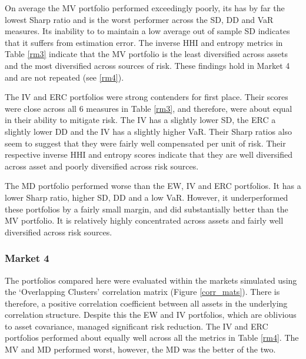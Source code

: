 \documentclass[11pt,preprint, authoryear]{elsarticle}
\numberwithin{equation}{section}
\numberwithin{figure}{section}
\numberwithin{table}{section}
\begin{document}
On average the MV portfolio performed exceedingly poorly, its has by far
the lowest Sharp ratio and is the worst performer across the SD, DD and
VaR measures. Its inability to to maintain a low average out of sample
SD indicates that it suffers from estimation error. The inverse HHI and
entropy metrics in Table \ref{rm3} indicate that the MV portfolio is the
least diversified across assets and the most diversified across sources
of risk. These findings hold in Market 4 and are not repeated (see
\ref{rm4}).

The IV and ERC portfolios were strong contenders for first place. Their
scores were close across all 6 measures in Table \ref{rm3}, and
therefore, were about equal in their ability to mitigate risk. The IV
has a slightly lower SD, the ERC a slightly lower DD and the IV has a
slightly higher VaR. Their Sharp ratios also seem to suggest that they
were fairly well compensated per unit of risk. Their respective inverse
HHI and entropy scores indicate that they are well diversified across
asset and poorly diversified across risk sources.

The MD portfolio performed worse than the EW, IV and ERC portfolios. It
has a lower Sharp ratio, higher SD, DD and a low VaR. However, it
underperformed these portfolios by a fairly small margin, and did
substantially better than the MV portfolio. It is relatively highly
concentrated across assets and fairly well diversified across risk
sources.

\hypertarget{market-4}{%
\subsubsection{Market 4}\label{market-4}}

The portfolios compared here were evaluated within the markets simulated
using the `Overlapping Clusters' correlation matrix (Figure
\ref{corr_mats}). There is therefore, a positive correlation coefficient
between all assets in the underlying correlation structure. Despite this
the EW and IV portfolios, which are oblivious to asset covariance,
managed significant risk reduction. The IV and ERC portfolios performed
about equally well across all the metrics in Table \ref{rm4}. The MV and
MD performed worst, however, the MD was the better of the two.
\end{document}
